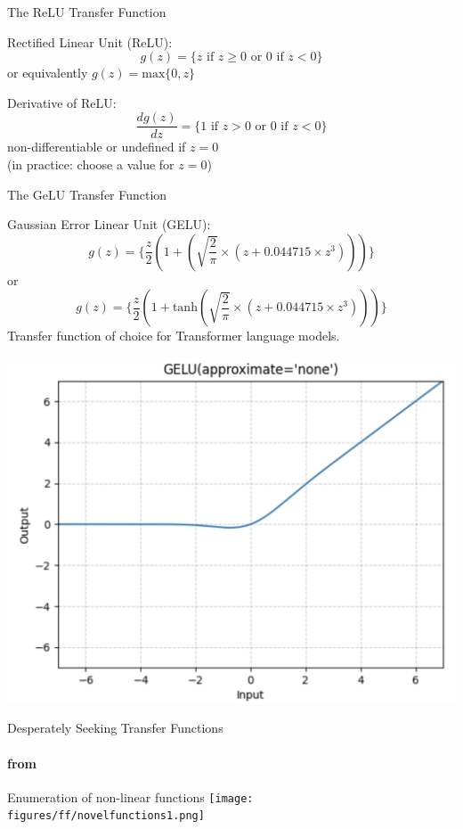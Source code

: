 \begin{frame}{The ReLU Transfer Function}
\begin{block}{Rectified Linear Unit (ReLU):}
\[ g(z) = \{ z \textrm{ if } z \geq 0 \textrm{ or } 0 \textrm{ if } z < 0 \} \]
or equivalently $g(z) = \textrm{max}\{0,z\}$
\end{block}

\pause
\begin{block}{Derivative of ReLU:}
\[ \frac{d g(z)}{dz} = \{ 1 \textrm{ if } z > 0 \textrm{ or } 0 \textrm{ if } z < 0 \} \]
non-differentiable or undefined if $z = 0$ \\
(in practice: choose a value for $z = 0$)
\end{block}
\end{frame}

\begin{frame}{The GeLU Transfer Function}
\begin{block}{Gaussian Error Linear Unit (GELU):}
\[ g(z) = \{ \frac{z}{2} (1 + (\sqrt{\frac{2}{\pi}} \times (z + 0.044715 \times z^3))) \} \]
or
\[ g(z) = \{ \frac{z}{2} (1 + \textrm{tanh}(\sqrt{\frac{2}{\pi}} \times (z + 0.044715 \times z^3))) \} \]
Transfer function of choice for Transformer language models.
\end{block}

\pause
\begin{center}
\includegraphics[scale=0.25]{figures/ff/gelu.png}
\end{center}
\end{frame}


\begin{frame}{Desperately Seeking Transfer Functions}
\framesubtitle{from \cite{Ramachandran2017}}
\begin{block}{Enumeration of non-linear functions}
\centering
\texttt{[image: figures/ff/novelfunctions1.png]}
\end{block}
\end{frame}

